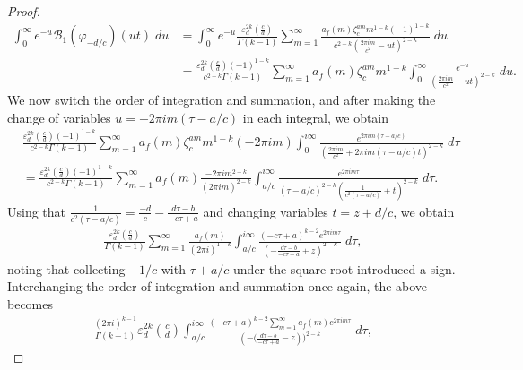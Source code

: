 \documentclass[12pt]{amsart}
\theoremstyle{definition}
\theoremstyle{plain}
\numberwithin{equation}{section}
\begin{document}
\begin{proof}
\begin{align*}
	\int_0^\infty e^{-u} \mathcal{B}_1(\varphi_{-d/c})(ut)\;du &= \int_0^\infty e^{-u} \frac{\varepsilon_d^{2k} \left( \frac{c}{d}\right)  }{\Gamma(k-1)}  \sum_{m=1}^\infty \frac{a_f(m)\zeta_c^{am}m^{1-k}(-1)^{1-k}}{c^{2-k}\left( \frac{2\pi i m}{c^2}- u t\right)^{2-k}}\;du\\
	&=\frac{\varepsilon_d^{2k} \left( \frac{c}{d}\right)  (-1)^{1-k}}{c^{2-k}\Gamma(k-1)}\sum_{m=1}^\infty a_f(m) \zeta_c^{am}m^{1-k}\int_{0}^\infty \frac{e^{-u}}{\left( \frac{2\pi i m}{c^2}- u t\right)^{2-k} }\;du.
\end{align*}
We now switch the order of integration and summation, and after making the change of variables $u = -2\pi i m (\tau-a/c)$ in each integral, we obtain
\begin{align*}
&\frac{\varepsilon_d^{2k} \left( \frac{c}{d}\right)  (-1)^{1-k}}{c^{2-k}\Gamma(k-1)}\sum_{m=1}^\infty a_f(m) \zeta_c^{am}m^{1-k}(-2\pi i m) \int_{0}^{i\infty} \frac{e^{2\pi i m (\tau-a/c)}}{\left( \frac{2\pi i m}{c^2}+ 2\pi i m(\tau-a/c) t\right)^{2-k} }\;d\tau	\\
&= \frac{\varepsilon_d^{2k} \left( \frac{c}{d}\right)  (-1)^{1-k}}{c^{2-k}\Gamma(k-1)}\sum_{m=1}^\infty a_f(m) \frac{-2\pi i m^{2-k}}{(2\pi i m)^{2-k}} \int_{a/c}^{i\infty} \frac{e^{2\pi i m \tau}}{(\tau - a/c)^{2-k}\left(\frac{ 1}{c^2(\tau-a/c)}+ t\right)^{2-k} }\;d\tau.	
\end{align*}
Using that $\frac{1}{c^2(\tau- a/c)} = \frac{-d}{c} - \frac{d\tau -b}{-c\tau +a}$ and changing variables $t=z+d/c$, we obtain \begin{align*}
 \frac{\varepsilon_d^{2k} \left( \frac{c}{d}\right)}{\Gamma(k-1)}\sum_{m=1}^\infty \frac{ a_f(m)}{(2\pi i)^{1-k}} \int_{a/c}^{i\infty} \frac{(-c\tau + a)^{k-2} e^{2\pi i m \tau}}{\left(-\frac{d\tau -b}{-c\tau+a}+ z\right)^{2-k} }\;d\tau,	
\end{align*}
noting that collecting $-1/c$ with $\tau+a/c$ under the square root introduced a sign. Interchanging the order of integration and summation once again, the above becomes
\begin{align*}
\frac{(2\pi i)^{k-1}}{\Gamma(k-1)}\varepsilon_d^{2k} \left( \frac{c}{d}\right)  \int_{a/c}^{i\infty} \frac{(-c\tau + a)^{k-2} \sum_{m=1}^\infty a_f(m) e^{2\pi i m \tau}}{\left(-(\frac{d\tau -b}{-c\tau+a}- z\right))^{2-k} }\;d\tau,

\end{align*}
\end{proof}
\end{document}
